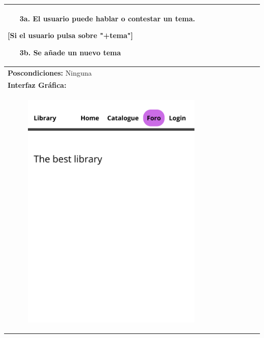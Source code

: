\documentclass{report}
\begin{document}
\begin{center}
\begin{longtable}{|p{\linewidth}|}
\begin{enumerate}
                            \newline
                            \begin{enumerate}
                                \item[3a.] El usuario puede hablar o contestar un tema.
                            \end{enumerate}
                            [Si el usuario pulsa sobre "+tema"]
                            \begin{enumerate}
                                \item[3b.] Se añade un nuevo tema
                            \end{enumerate}
                        \end{enumerate}\\
                        \hline
                        \textbf{Poscondiciones:} Ninguna\\
                        \hline
                        \textbf{Interfaz Gráfica:}\\
                        \begin{figure}[H]
                            \centering
                            \includegraphics[width=0.8\textwidth]{./img/grafico/Foro1.png}

\end{figure}
\end{longtable}
\end{center}
\end{document}
